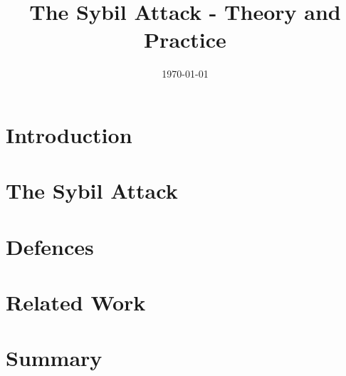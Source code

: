 \documentclass[12pt]{article}
\title{The Sybil Attack - Theory and Practice}
\date{\today}
\begin{document}
\maketitle
\begin{abstract}
\end{abstract}

\section{Introduction}


% 

\section{The Sybil Attack}\label{sec:sybil}


\section{Defences}\label{sec:defences}


\section{Related Work}\label{sec:related}


\section{Summary}\label{sec:summary}

\printbibliography
\end{document}
